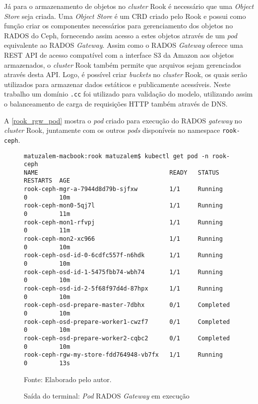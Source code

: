 Já para o armazenamento de objetos no \textit{cluster} Rook é necessário que uma \textit{Object Store} seja criada. Uma \textit{Object Store} é um \ac{CRD} criado pelo Rook e possui como função criar os componentes necessários para gerenciamento dos objetos no \ac{RADOS} do Ceph, fornecendo assim acesso a estes objetos através de um \textit{pod} equivalente ao \ac{RADOS} \textit{Gateway}. Assim como o \ac{RADOS} \textit{Gateway} oferece uma \ac{REST} \ac{API} de acesso compatível com a interface S3 da Amazon aos objetos armazenados, o \textit{cluster} Rook também permite que arquivos sejam gerenciados através desta \ac{API}. Logo, é possível criar \textit{buckets} no \textit{cluster} Rook, os quais serão utilizados para armazenar dados estáticos e publicamente acessíveis. Neste trabalho um domínio \texttt{.cc} foi utilizado para validação do modelo, utilizando assim o balanceamento de carga de requisições \ac{HTTP} também através de \ac{DNS}.

A \autoref{rook_rgw_pod} mostra o \textit{pod} criado para execução do \ac{RADOS} \textit{gateway} no \textit{cluster} Rook, juntamente com os outros \textit{pods} disponíveis no namespace \texttt{rook-ceph}.

\begin{figure}[!htpb]
	\centering
	\caption{Saída do terminal: \textit{Pod} \ac{RADOS} \textit{Gateway} em execução}
    \begin{verbatim}
matuzalem-macbook:rook matuzalem$ kubectl get pod -n rook-ceph
NAME                                     READY   STATUS     RESTARTS  AGE
rook-ceph-mgr-a-7944d8d79b-sjfxw         1/1     Running    0         10m
rook-ceph-mon0-5qj7l                     1/1     Running    0         11m
rook-ceph-mon1-rfvpj                     1/1     Running    0         11m
rook-ceph-mon2-xc966                     1/1     Running    0         10m
rook-ceph-osd-id-0-6cdfc557f-n6hdk       1/1     Running    0         10m
rook-ceph-osd-id-1-5475fbb74-wbh74       1/1     Running    0         10m
rook-ceph-osd-id-2-5f68f97d4d-87hpx      1/1     Running    0         10m
rook-ceph-osd-prepare-master-7dbhx       0/1     Completed  0         10m
rook-ceph-osd-prepare-worker1-cwzf7      0/1     Completed  0         10m
rook-ceph-osd-prepare-worker2-cqbc2      0/1     Completed  0         10m
rook-ceph-rgw-my-store-fdd764948-vb7fx   1/1     Running    0         13s
    \end{verbatim}
	Fonte: Elaborado pelo autor.
 	\label{rook_rgw_pod}
\end{figure}


